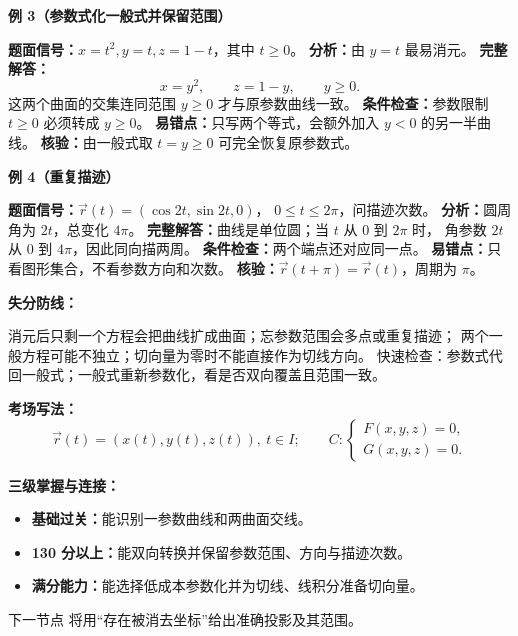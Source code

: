 \begin{knowledgeBox}
\textbf{例 3（参数式化一般式并保留范围）}

\textbf{题面信号：}\(x=t^2,y=t,z=1-t\)，其中 \(t\ge0\)。
\textbf{分析：}由 \(y=t\) 最易消元。
\textbf{完整解答：}
\[
x=y^2,\qquad z=1-y,\qquad y\ge0.
\]
这两个曲面的交集连同范围 \(y\ge0\) 才与原参数曲线一致。
\textbf{条件检查：}参数限制 \(t\ge0\) 必须转成 \(y\ge0\)。
\textbf{易错点：}只写两个等式，会额外加入 \(y<0\) 的另一半曲线。
\textbf{核验：}由一般式取 \(t=y\ge0\) 可完全恢复原参数式。

\textbf{例 4（重复描迹）}

\textbf{题面信号：}\(\vec r(t)=(\cos2t,\sin2t,0)\)，
\(0\le t\le2\pi\)，问描迹次数。
\textbf{分析：}圆周角为 \(2t\)，总变化 \(4\pi\)。
\textbf{完整解答：}曲线是单位圆；当 \(t\) 从 \(0\) 到 \(2\pi\) 时，
角参数 \(2t\) 从 \(0\) 到 \(4\pi\)，因此同向描两周。
\textbf{条件检查：}两个端点还对应同一点。
\textbf{易错点：}只看图形集合，不看参数方向和次数。
\textbf{核验：}\(\vec r(t+\pi)=\vec r(t)\)，周期为 \(\pi\)。

\textbf{失分防线：}

消元后只剩一个方程会把曲线扩成曲面；忘参数范围会多点或重复描迹；
两个一般方程可能不独立；切向量为零时不能直接作为切线方向。
快速检查：参数式代回一般式；一般式重新参数化，看是否双向覆盖且范围一致。

\textbf{考场写法：}
\[
\boxed{\vec r(t)=(x(t),y(t),z(t)),\ t\in I;\qquad
C:\begin{cases}F(x,y,z)=0,\\G(x,y,z)=0.\end{cases}}
\]

\textbf{三级掌握与连接：}
\begin{itemize}
  \item \textbf{基础过关：}能识别一参数曲线和两曲面交线。
  \item \textbf{130 分以上：}能双向转换并保留参数范围、方向与描迹次数。
  \item \textbf{满分能力：}能选择低成本参数化并为切线、线积分准备切向量。
\end{itemize}
下一节点 
将用“存在被消去坐标”给出准确投影及其范围。
\end{knowledgeBox}



